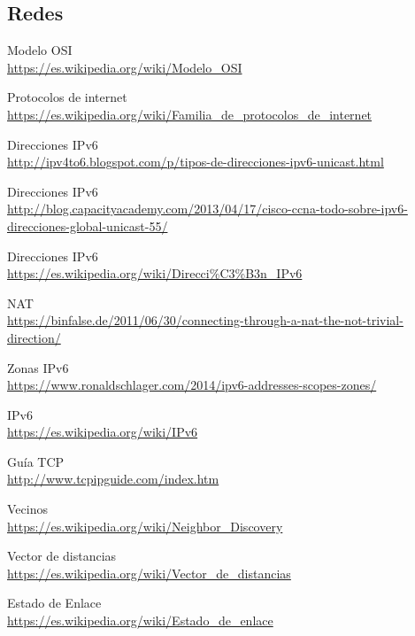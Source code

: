 \begin{thebibliography}{9}
\section*{Redes}
\bibitem{} 
Modelo OSI
\\\url{https://es.wikipedia.org/wiki/Modelo\_OSI}

\bibitem{} 
Protocolos de internet
\\\url{https://es.wikipedia.org/wiki/Familia\_de\_protocolos\_de\_internet}

\bibitem{} 
Direcciones IPv6
\\\url{http://ipv4to6.blogspot.com/p/tipos-de-direcciones-ipv6-unicast.html}

\bibitem{} 
Direcciones IPv6
\\\url{http://blog.capacityacademy.com/2013/04/17/cisco-ccna-todo-sobre-ipv6-direcciones-global-unicast-55/}

\bibitem{} 
Direcciones IPv6
\\\url{https://es.wikipedia.org/wiki/Direcci\%C3\%B3n\_IPv6}

\bibitem{} 
NAT
\\\url{https://binfalse.de/2011/06/30/connecting-through-a-nat-the-not-trivial-direction/}

\bibitem{} 
Zonas IPv6
\\\url{https://www.ronaldschlager.com/2014/ipv6-addresses-scopes-zones/}

\bibitem{} 
IPv6
\\\url{https://es.wikipedia.org/wiki/IPv6}

\bibitem{} 
Guía TCP
\\\url{http://www.tcpipguide.com/index.htm}

\bibitem{} 
Vecinos
\\\url{https://es.wikipedia.org/wiki/Neighbor\_Discovery}

\bibitem{} 
Vector de distancias
\\\url{https://es.wikipedia.org/wiki/Vector\_de\_distancias}

\bibitem{} 
Estado de Enlace
\\\url{https://es.wikipedia.org/wiki/Estado\_de\_enlace}


\end{thebibliography}
